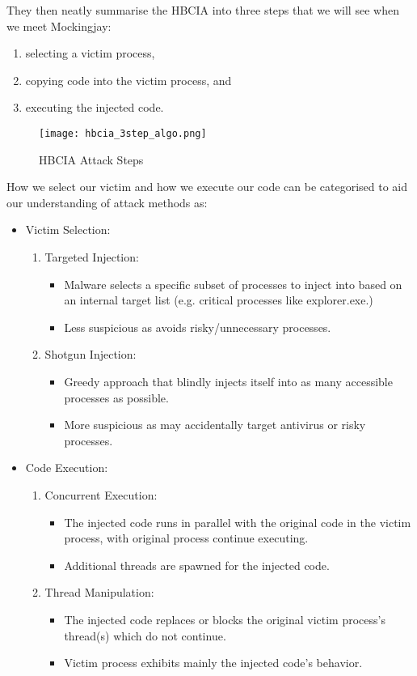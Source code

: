 They then neatly summarise the HBCIA into three steps that we will see when we meet Mockingjay:

\begin{enumerate}
\item selecting a victim process,
\item copying code into the victim process, and
\item executing the injected code.
\end{enumerate}

\begin{figure}[ht]
\texttt{[image: hbcia\_3step\_algo.png]}
\caption{HBCIA Attack Steps \autocite{Barabosch:2014}}
\end{figure}


How we select our victim and how we execute our code can be categorised to aid our understanding of attack methods as:

\begin{itemize}
\item Victim Selection:
  \begin{enumerate}
  \item Targeted Injection:
    \begin{itemize}
    \item Malware selects a specific subset of processes to inject into based on an internal target list (e.g. critical
        processes like explorer.exe.)
    \item Less suspicious as avoids risky/unnecessary processes.
    \end{itemize}
  \item Shotgun Injection:
    \begin{itemize}
    \item Greedy approach that blindly injects itself into as many accessible processes as possible.
    \item More suspicious as may accidentally target antivirus or risky processes.
    \end{itemize}
  \end{enumerate}
\item Code Execution:
  \begin{enumerate}
  \item Concurrent Execution:
    \begin{itemize}
    \item The injected code runs in parallel with the original code in the victim process, with original process continue executing.
    \item Additional threads are spawned for the injected code.
    \end{itemize}
  \item Thread Manipulation:
    \begin{itemize}
    \item The injected code replaces or blocks the original victim process's thread(s) which do not continue.
    \item Victim process exhibits mainly the injected code's behavior.
    \end{itemize}
  \end{enumerate}
\end{itemize}

